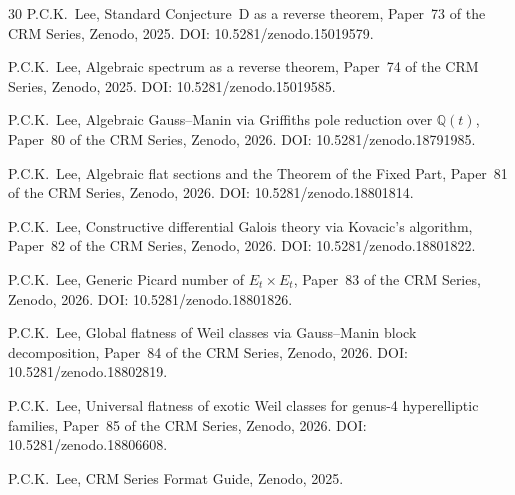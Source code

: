 \documentclass[11pt]{article}
\theoremstyle{plain}
\theoremstyle{definition}
\theoremstyle{remark}
\newcommand{\Q}{\mathbb{Q}}
\begin{document}
\begin{thebibliography}{30}
P.C.K.~Lee,
Standard Conjecture~D as a reverse theorem,
Paper~73 of the CRM Series, Zenodo, 2025.
DOI: 10.5281/zenodo.15019579.

P.C.K.~Lee,
Algebraic spectrum as a reverse theorem,
Paper~74 of the CRM Series, Zenodo, 2025.
DOI: 10.5281/zenodo.15019585.

P.C.K.~Lee,
Algebraic Gauss--Manin via Griffiths pole reduction over $\Q(t)$,
Paper~80 of the CRM Series, Zenodo, 2026.
DOI: 10.5281/zenodo.18791985.

P.C.K.~Lee,
Algebraic flat sections and the Theorem of the Fixed Part,
Paper~81 of the CRM Series, Zenodo, 2026.
DOI: 10.5281/zenodo.18801814.

P.C.K.~Lee,
Constructive differential Galois theory via Kovacic's algorithm,
Paper~82 of the CRM Series, Zenodo, 2026.
DOI: 10.5281/zenodo.18801822.

P.C.K.~Lee,
Generic Picard number of $E_t \times E_t$,
Paper~83 of the CRM Series, Zenodo, 2026.
DOI: 10.5281/zenodo.18801826.

P.C.K.~Lee,
Global flatness of Weil classes via Gauss--Manin block decomposition,
Paper~84 of the CRM Series, Zenodo, 2026.
DOI: 10.5281/zenodo.18802819.

P.C.K.~Lee,
Universal flatness of exotic Weil classes for genus-4 hyperelliptic families,
Paper~85 of the CRM Series, Zenodo, 2026.
DOI: 10.5281/zenodo.18806608.

P.C.K.~Lee,
CRM Series Format Guide,
Zenodo, 2025.

\end{thebibliography}
\end{document}
